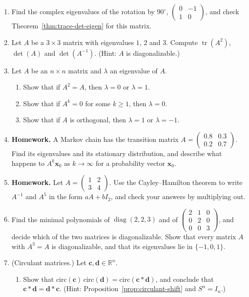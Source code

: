 \documentclass[11pt]{article}
\newcommand{\homework}{\textcolor{red!70!black}{\textbf{Homework.}}}
\theoremstyle{definition}
\theoremstyle{plain}
\theoremstyle{remark}
\DeclareMathOperator{\tr}{tr}
\DeclareMathOperator{\diag}{diag}
\begin{document}
\begin{enumerate}[leftmargin=*]
	\item Find the complex eigenvalues of the rotation by $90^\circ$, $\begin{pmatrix} 0 & -1 \\ 1 & 0 \end{pmatrix}$, and check Theorem~\ref{thm:trace-det-eigen} for this matrix.
	\item Let $A$ be a $3 \times 3$ matrix with eigenvalues $1$, $2$ and $3$. Compute $\tr(A^2)$, $\det(A)$ and $\det(A^{-1})$. (Hint: $A$ is diagonalizable.)
	\item Let $A$ be an $n \times n$ matrix and $\lambda$ an eigenvalue of $A$.
	\begin{enumerate}
		\item Show that if $A^2 = A$, then $\lambda = 0$ or $\lambda = 1$.
		\item Show that if $A^k = 0$ for some $k \geq 1$, then $\lambda = 0$.
		\item Show that if $A$ is orthogonal, then $\lambda = 1$ or $\lambda = -1$.
	\end{enumerate}
	\item \homework{} A Markov chain has the transition matrix $A = \begin{pmatrix} 0.8 & 0.3 \\ 0.2 & 0.7 \end{pmatrix}$. Find its eigenvalues and its stationary distribution, and describe what happens to $A^k \mathbf{x}_0$ as $k \to \infty$ for a probability vector $\mathbf{x}_0$.
	\item \homework{} Let $A = \begin{pmatrix} 1 & 2 \\ 3 & 4 \end{pmatrix}$. Use the Cayley--Hamilton theorem to write $A^{-1}$ and $A^5$ in the form $aA + bI_2$, and check your answers by multiplying out.
	\item Find the minimal polynomials of $\diag(2, 2, 3)$ and of $\begin{pmatrix} 2 & 1 & 0 \\ 0 & 2 & 0 \\ 0 & 0 & 3 \end{pmatrix}$, and decide which of the two matrices is diagonalizable. Show that every matrix $A$ with $A^3 = A$ is diagonalizable, and that its eigenvalues lie in $\{-1, 0, 1\}$.
	\item (Circulant matrices.) Let $\mathbf{c}, \mathbf{d} \in \mathbb{R}^n$.
	\begin{enumerate}
		\item Show that $\mathrm{circ}(\mathbf{c})\,\mathrm{circ}(\mathbf{d}) = \mathrm{circ}(\mathbf{c} \ast \mathbf{d})$, and conclude that $\mathbf{c} \ast \mathbf{d} = \mathbf{d} \ast \mathbf{c}$. (Hint: Proposition~\ref{prop:circulant-shift} and $S^n = I_n$.)

\end{enumerate}
\end{enumerate}
\end{document}

